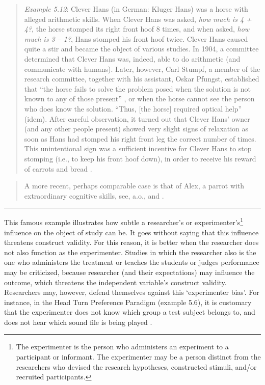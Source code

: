 \documentclass[
]{book}
\begin{document}
\begin{quote}
\emph{Example 5.12}: Clever Hans (in German: Kluger Hans) was a horse with alleged arithmetic skills. When Clever Hans was asked, \emph{how much is 4 + 4?}, the horse stomped its right front hoof 8 times, and when asked, \emph{how much is 3 -- 1?}, Hans stomped his front hoof twice. Clever Hans caused quite a stir and became the object of various studies. In 1904, a committee determined that Clever Hans was, indeed, able to do arithmetic (and communicate with humans). Later, however, Carl Stumpf, a member of the research committee, together with his assistant, Oskar Pfungst, established that ``the horse fails to solve the problem posed when the solution is not known to any of those present'' \citep[p.185, vert. AN]{Pfung07}, or when the horse cannot see the person who does know the solution. ``Thus, {[}the horse{]} required optical help'' (idem). After careful observation, it turned out that Clever Hans' owner (and any other people present) showed very slight signs of relaxation as soon as Hans had stomped his right front leg the correct number of times. This unintentional sign was a sufficient incentive for Clever Hans to stop stomping (i.e., to keep his front hoof down), in order to receive his reward of carrots and bread \citep{Pfung07} \citep[p.38--47]{Watz77}.
\end{quote}

\begin{quote}
A more recent, perhaps comparable case is that of Alex, a parrot with extraordinary cognitive skills, see, a.o., \citet{BLLB14} and \citet{Alex15}.
\end{quote}

\begin{center}\rule{0.5\linewidth}{0.5pt}\end{center}

This famous example illustrates how subtle a researcher's or experimenter's\footnote{The experimenter is the person who administers an experiment to a participant or informant. The experimenter may be a person distinct from the researchers who devised the research hypotheses, constructed stimuli, and/or recruited participants.} influence on the object of study can be. It goes without saying that this influence threatens construct validity. For this reason, it is better when the researcher does not also function as the experimenter. Studies in which the researcher also is the one who administers the treatment or teaches the students or judges performance may be criticized, because researcher (and their expectations) may influence the outcome, which threatens the independent variable's construct validity. Researchers may, however, defend themselves against this `experimenter bias'. For instance, in the Head Turn Preference Paradigm (example 5.6), it is customary that the experimenter does not know which group a test subject belongs to, and does not hear which sound file is being played \citep[p.74]{John10}.
\end{document}
